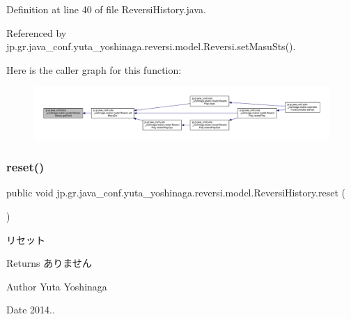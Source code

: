 Definition at line 40 of file Reversi\+History.\+java.



Referenced by jp.\+gr.\+java\+\_\+conf.\+yuta\+\_\+yoshinaga.\+reversi.\+model.\+Reversi.\+set\+Masu\+Sts().

Here is the caller graph for this function\+:
\nopagebreak
\begin{figure}[H]
\begin{center}
\leavevmode
\includegraphics[width=350pt]{classjp_1_1gr_1_1java__conf_1_1yuta__yoshinaga_1_1reversi_1_1model_1_1_reversi_history_a108f7d23cbfcd1466c954123a3d8109c_icgraph}
\end{center}
\end{figure}
\mbox{\label{classjp_1_1gr_1_1java__conf_1_1yuta__yoshinaga_1_1reversi_1_1model_1_1_reversi_history_aee0155159a017671c2b18c1d8229d8d1}} 
\subsubsection{\texorpdfstring{reset()}{reset()}}
{\footnotesize\ttfamily public void jp.\+gr.\+java\+\_\+conf.\+yuta\+\_\+yoshinaga.\+reversi.\+model.\+Reversi\+History.\+reset (\begin{DoxyParamCaption}{ }\end{DoxyParamCaption})}



リセット 

\begin{DoxyReturn}{Returns}
ありません 
\end{DoxyReturn}
\begin{DoxyAuthor}{Author}
Yuta Yoshinaga 
\end{DoxyAuthor}
\begin{DoxyDate}{Date}
2014.. 
\end{DoxyDate}


